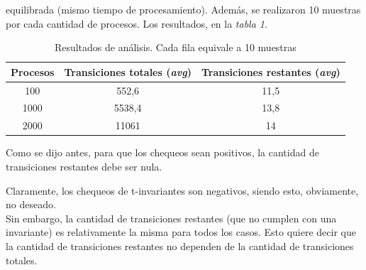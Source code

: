 \documentclass{article}
\begin{document}
    equilibrada (mismo tiempo de procesamiento). Además, se realizaron 10 muestras por cada 
    cantidad de procesos. Los resultados, en la \emph{tabla 1}.\newline \newline
    \begin{center}
        \begin{table}[h]
            \begin{tabular}{||c|c|c||} 
                \hline
                Procesos & Transiciones totales (\emph{avg}) & Transiciones restantes (\emph{avg}) \\ [0.5ex] 
                \hline\hline
                100 & 552,6 & 11,5 \\ 
                \hline
                1000 & 5538,4 & 13,8 \\
                \hline
                2000 & 11061 & 14 \\
                \hline
            \end{tabular}
            \caption{Resultados de análisis. Cada fila equivale a 10 muestras}
        \end{table}
    \end{center} \par
    Como se dijo antes, para que los chequeos sean positivos, la cantidad de transiciones restantes
    debe ser nula. \par
    Claramente, los chequeos de t-invariantes son negativos, siendo esto, obviamente, no deseado. \\
    Sin embargo, la cantidad de transiciones restantes (que no cumplen con una invariante) es 
    relativamente la misma para todos los casos. Esto quiere decir que la cantidad de transiciones
    restantes no dependen de la cantidad de transiciones totales.
\end{document}
